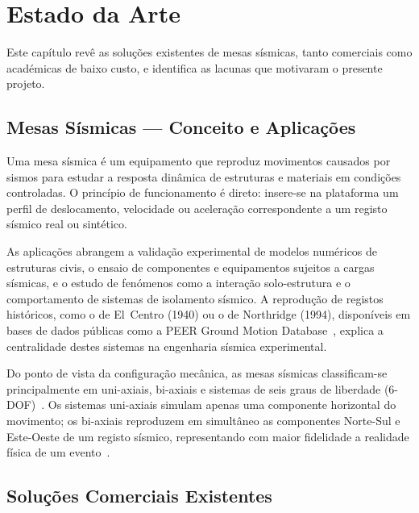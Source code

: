 
\chapter{Estado da Arte}
\label{chapter:stateofart}

\begin{introduction}
Este capítulo revê as soluções existentes de mesas sísmicas, tanto comerciais como académicas de baixo custo, e identifica as lacunas que motivaram o presente projeto.
\end{introduction}

\section{Mesas Sísmicas --- Conceito e Aplicações}
\label{sec:conceito}

Uma mesa sísmica é um equipamento que reproduz movimentos causados por sismos para estudar a resposta dinâmica de estruturas e materiais em condições controladas. O princípio de funcionamento é direto: insere-se na plataforma um perfil de deslocamento, velocidade ou aceleração correspondente a um registo sísmico real ou sintético.

As aplicações abrangem a validação experimental de modelos numéricos de estruturas civis, o ensaio de componentes e equipamentos sujeitos a cargas sísmicas, e o estudo de fenómenos como a interação solo-estrutura e o comportamento de sistemas de isolamento sísmico. A reprodução de registos históricos, como o de El~Centro (1940) ou o de Northridge (1994), disponíveis em bases de dados públicas como a PEER Ground Motion Database~\cite{PEERDatabase}, explica a centralidade destes sistemas na engenharia sísmica experimental.

Do ponto de vista da configuração mecânica, as mesas sísmicas classificam-se principalmente em uni-axiais, bi-axiais e sistemas de seis graus de liberdade (6-DOF)~\cite{Damci2018}. Os sistemas uni-axiais simulam apenas uma componente horizontal do movimento; os bi-axiais reproduzem em simultâneo as componentes Norte-Sul e Este-Oeste de um registo sísmico, representando com maior fidelidade a realidade física de um evento~\cite{2DOF2025}.

\section{Soluções Comerciais Existentes}
\label{sec:comerciais}

